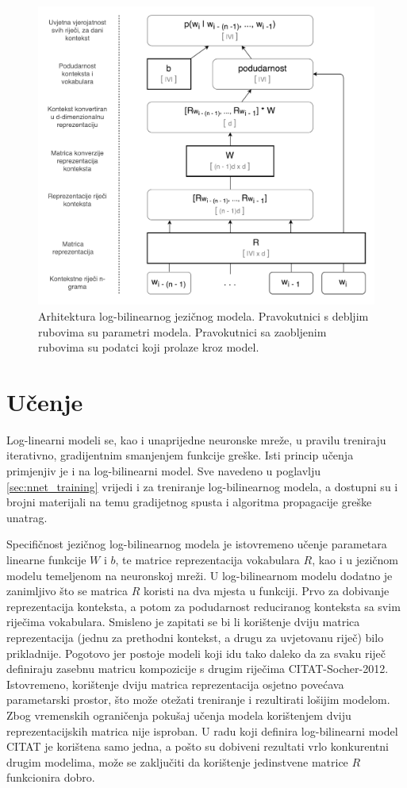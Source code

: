 \documentclass[times, utf8, diplomski, numeric]{fer}
\begin{document}
\begin{figure}[!htb]
\centering
\includegraphics[scale=0.5]{fig/lbl.pdf}
\caption{Arhitektura log-bilinearnog jezičnog modela. Pravokutnici s debljim rubovima su parametri modela. Pravokutnici sa zaobljenim rubovima su podatci koji prolaze kroz model.}
\label{fig:lbl}
\end{figure}

\section{Učenje}

Log-linearni modeli se, kao i unaprijedne neuronske mreže, u pravilu treniraju iterativno, gradijentnim smanjenjem funkcije greške. Isti princip učenja primjenjiv je i na log-bilinearni model. Sve navedeno u poglavlju \ref{sec:nnet_training} vrijedi i za treniranje log-bilinearnog modela, a dostupni su i brojni materijali na temu gradijetnog spusta i algoritma propagacije greške unatrag.

Specifičnost jezičnog log-bilinearnog modela je istovremeno učenje parametara linearne funkcije $W$ i $b$, te matrice reprezentacija vokabulara $R$, kao i u jezičnom modelu temeljenom na neuronskoj mreži. U log-bilinearnom modelu dodatno je zanimljivo što se matrica $R$ koristi na dva mjesta u funkciji. Prvo za dobivanje reprezentacija konteksta, a potom za podudarnost reduciranog konteksta sa svim riječima vokabulara. Smisleno je zapitati se bi li korištenje dviju matrica reprezentacija (jednu za prethodni kontekst, a drugu za uvjetovanu riječ) bilo prikladnije. Pogotovo jer postoje modeli koji idu tako daleko da za svaku riječ definiraju zasebnu matricu kompozicije s drugim riječima CITAT-Socher-2012. Istovremeno, korištenje dviju matrica reprezentacija osjetno povećava parametarski prostor, što može otežati treniranje i rezultirati lošijim modelom. Zbog vremenskih ograničenja pokušaj učenja modela korištenjem dviju reprezentacijskih matrica nije isproban. U radu koji definira log-bilinearni model CITAT je korištena samo jedna, a pošto su dobiveni rezultati vrlo konkurentni drugim modelima, može se zaključiti da korištenje jedinstvene matrice $R$ funkcionira dobro.
\end{document}
